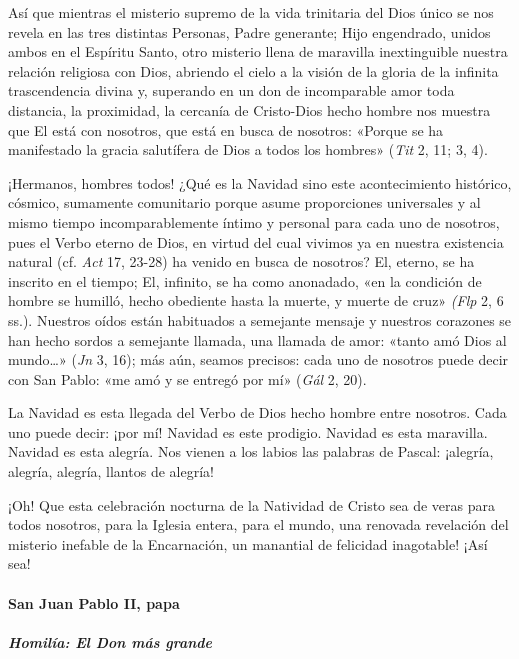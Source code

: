 \documentclass[]{article}
\let\oldparagraph\paragraph
\renewcommand{\paragraph}[1]{\oldparagraph{#1}\mbox{}}
\let\oldsubparagraph\subparagraph
\renewcommand{\subparagraph}[1]{\oldsubparagraph{#1}\mbox{}}
\begin{document}
Así que mientras el misterio supremo de la vida trinitaria del Dios
único se nos revela en las tres distintas Personas, Padre generante;
Hijo engendrado, unidos ambos en el Espíritu Santo, otro misterio llena
de maravilla inextinguible nuestra relación religiosa con Dios, abriendo
el cielo a la visión de la gloria de la infinita trascendencia divina y,
superando en un don de incomparable amor toda distancia, la proximidad,
la cercanía de Cristo-Dios hecho hombre nos muestra que El está con
nosotros, que está en busca de nosotros: «Porque se ha manifestado la
gracia salutífera de Dios a todos los hombres» (\emph{Tit} 2, 11; 3, 4).

¡Hermanos, hombres todos! ¿Qué es la Navidad sino este acontecimiento
histórico, cósmico, sumamente comunitario porque asume proporciones
universales y al mismo tiempo incomparablemente íntimo y personal para
cada uno de nosotros, pues el Verbo eterno de Dios, en virtud del cual
vivimos ya en nuestra existencia natural (cf. \emph{Act} 17, 23-28) ha
venido en busca de nosotros? El, eterno, se ha inscrito en el tiempo;
El, infinito, se ha como anonadado, «en la condición de hombre se
humilló, hecho obediente hasta la muerte, y muerte de cruz» \emph{(Flp}
2, 6 ss.). Nuestros oídos están habituados a semejante mensaje y
nuestros corazones se han hecho sordos a semejante llamada, una llamada
de amor: «tanto amó Dios al mundo\ldots{}» (\emph{Jn} 3, 16); más aún,
seamos precisos: cada uno de nosotros puede decir con San Pablo: «me amó
y se entregó por mí» (\emph{Gál} 2, 20).

La Navidad es esta llegada del Verbo de Dios hecho hombre entre
nosotros. Cada uno puede decir: ¡por mí! Navidad es este prodigio.
Navidad es esta maravilla. Navidad es esta alegría. Nos vienen a los
labios las palabras de Pascal: ¡alegría, alegría, alegría, llantos de
alegría!

¡Oh! Que esta celebración nocturna de la Natividad de Cristo sea de
veras para todos nosotros, para la Iglesia entera, para el mundo, una
renovada revelación del misterio inefable de la Encarnación, un
manantial de felicidad inagotable! ¡Así sea!

\paragraph{San Juan Pablo II, papa}\label{san-juan-pablo-ii-papa-5}

\subparagraph{Homilía: El Don más
grande}\label{homiluxeda-el-don-muxe1s-grande}
\end{document}
